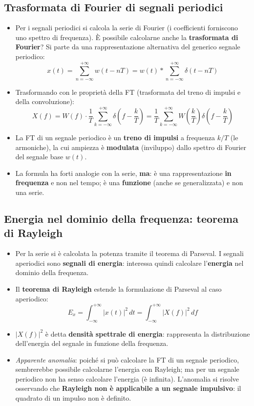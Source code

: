 \documentclass[12pt, a4paper]{article}
\begin{document}
\subsection{Trasformata di Fourier di segnali periodici}
\begin{itemize}
    \item Per i segnali periodici si calcola la serie di Fourier (i coefficienti forniscono uno spettro di frequenza). È possibile calcolarne anche la \textbf{trasformata di Fourier}? Si parte da una rappresentazione alternativa del generico segnale periodico:
    $$x(t)=\sum_{n=-\infty}^{+\infty}w(t-nT)=w(t)*\sum_{n=-\infty}^{+\infty}\delta(t-nT)$$
    \item Trasformando con le proprietà della FT (trasformata del treno di impulsi e della convoluzione):
    $$X(f)=W(f)\cdot\frac1T\sum_{k=-\infty}^{+\infty}\delta\!\left(f-\frac kT\right)=\frac1T\sum_{k=-\infty}^{+\infty}W\!\left(\frac kT\right)\delta\!\left(f-\frac kT\right)$$
    \item La FT di un segnale periodico è un \textbf{treno di impulsi} a frequenza $k/T$ (le armoniche), la cui ampiezza è \textbf{modulata} (inviluppo) dallo spettro di Fourier del segnale base $w(t)$.
    \item La formula ha forti analogie con la serie, \textbf{ma}: è una rappresentazione \textbf{in frequenza} e non nel tempo; è una \textbf{funzione} (anche se generalizzata) e non una serie.
\end{itemize}

\subsection{Energia nel dominio della frequenza: teorema di Rayleigh}
\begin{itemize}
    \item Per la serie si è calcolata la potenza tramite il teorema di Parseval. I segnali aperiodici sono \textbf{segnali di energia}: interessa quindi calcolare l'\textbf{energia} nel dominio della frequenza.
    \item Il \textcolor{orange!80!black}{\textbf{teorema di Rayleigh}} estende la formulazione di Parseval al caso aperiodico:
    $$E_x=\int_{-\infty}^{+\infty}|x(t)|^2\,dt=\int_{-\infty}^{+\infty}|X(f)|^2\,df$$
    \item $|X(f)|^2$ è detta \textbf{densità spettrale di energia}: rappresenta la distribuzione dell'energia del segnale in funzione della frequenza.
    \item \textit{Apparente anomalia}: poiché si può calcolare la FT di un segnale periodico, sembrerebbe possibile calcolarne l'energia con Rayleigh; ma per un segnale periodico non ha senso calcolare l'energia (è infinita). L'anomalia si risolve osservando che \textbf{Rayleigh non è applicabile a un segnale impulsivo}: il quadrato di un impulso non è definito.
\end{itemize}
\end{document}
